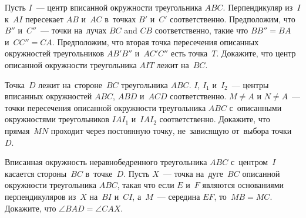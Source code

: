 \begin{problems}
\item
Пусть $I$~--- центр вписанной окружности треугольника $ABC$.
Перпендикуляр из~$I$ к~$AI$ пересекает $AB$ и~$AC$ в~точках $B'$ и~$C'$
соответственно.
Предположим, что $B''$ и~$C''$~--- точки на~лучах $BC$ and $CB$ соответственно,
такие что $B B'' = BA$ и~$C C'' = CA$.
Предположим, что вторая точка пересечения описанных окружностей
треугольников $A B' B''$ и~$A C' C''$ есть точка~$T$.
Докажите, что центр описанной окружности треугольника $AIT$ лежит на~$BC$.

\item
Точка~$D$ лежит на~стороне~$BC$ треугольника $ABC$.
$I$, $I_1$ и~$I_2$~--- центры вписанных окружностей $ABC$, $ABD$ и~$ACD$
соответственно.
$M \neq A$ и $N \neq A$~--- точки пересечения описанной окружности треугольника
$ABC$ с~описанными окружностями треугольников $I A I_1$ и~$I A I_2$
соответственно.
Докажите, что прямая~$MN$ проходит через постоянную точку, не~зависящую
от~выбора точки~$D$.

\item
Вписанная окружность неравнобедренного треугольника $ABC$ с~центром~$I$
касается стороны~$BC$ в~точке~$D$.
Пусть $X$~--- точка на~дуге~$BC$ описанной окружности треугольника $ABC$, такая
что если $E$ и~$F$ являются основаниями перпендикуляров из~$X$ на~$BI$ и~$CI$,
а~$M$~--- середина $EF$, то~$MB = MC$.
Докажите, что $\angle BAD = \angle CAX$.

\end{problems}

